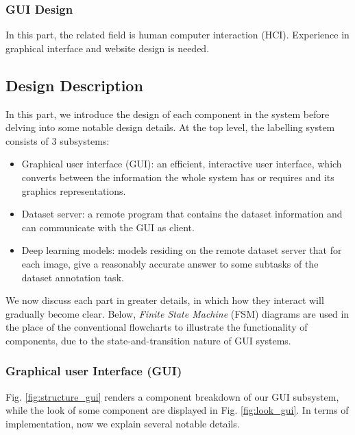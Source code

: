 \subsubsection{GUI Design}
In this part, the related field is human computer interaction (HCI). Experience in graphical interface and website design is needed. 

\subsection{Design Description}

In this part, we introduce the design of each component in the system before delving into some notable design details. At the top level, the labelling system consists of 3 subsystems:
\begin{itemize}
    \item Graphical user interface (GUI): an efficient, interactive user interface, which converts between the information the whole system has or requires and its graphics representations.
    \item Dataset server: a remote program that contains the dataset information and can communicate with the GUI as client.
    \item Deep learning models: models residing on the remote dataset server that for each image, give a reasonably accurate answer to some subtasks of the dataset annotation task.
\end{itemize}

We now discuss each part in greater details, in which how they interact will gradually become clear. Below, \textit{Finite State Machine} (FSM) diagrams are used in the place of the conventional flowcharts to illustrate the functionality of components, due to the state-and-transition nature of GUI systems.

\subsubsection{Graphical user Interface (GUI)}
\label{sec:gui}

Fig. \ref{fig:structure_gui} renders a component breakdown of our GUI subsystem, while the look of some component are displayed in Fig. \ref{fig:look_gui}. In terms of implementation, now we explain several notable details.

